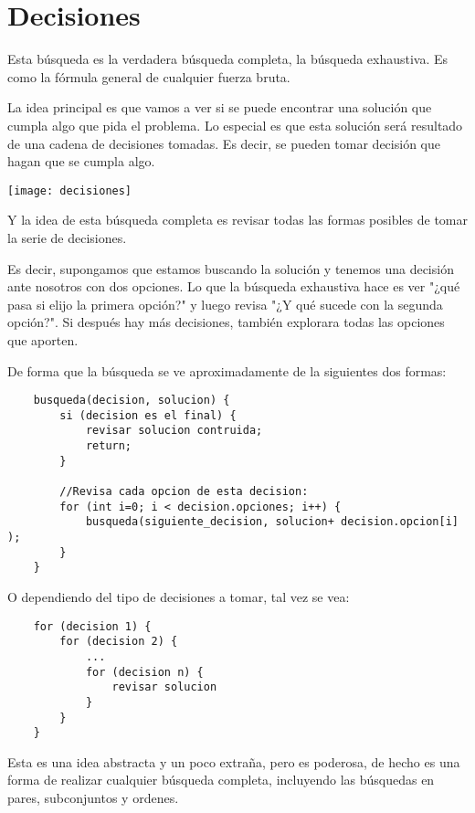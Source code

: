 \chapter*{Decisiones}

Esta búsqueda es la verdadera búsqueda completa, la búsqueda exhaustiva. Es como la fórmula general de cualquier fuerza bruta.

La idea principal es que vamos a ver si se puede encontrar una solución que cumpla algo que pida el problema. Lo especial es que esta solución será resultado de una cadena de decisiones tomadas. Es decir, se pueden tomar decisión que hagan que se cumpla algo. 


\begin{center}
	\texttt{[image: decisiones]}
\end{center}

Y la idea de esta búsqueda completa es revisar todas las formas posibles de tomar la serie de decisiones. 

Es decir, supongamos que estamos buscando la solución y tenemos una decisión ante nosotros con dos opciones. Lo que la búsqueda exhaustiva hace es ver "¿qué pasa si elijo la primera opción?" y luego revisa "¿Y qué sucede con la segunda opción?". Si después hay más decisiones, también explorara todas las opciones que aporten.

De forma que la búsqueda se ve aproximadamente de la siguientes dos formas:
\begin{lstlisting}
	busqueda(decision, solucion) {
		si (decision es el final) {
			revisar solucion contruida;
			return;
		}
	
		//Revisa cada opcion de esta decision:
		for (int i=0; i < decision.opciones; i++) {
			busqueda(siguiente_decision, solucion+ decision.opcion[i] );
		}
	}
\end{lstlisting}

O dependiendo del tipo de decisiones a tomar, tal vez se vea:

\begin{lstlisting}
	for (decision 1) {
		for (decision 2) {
			...
			for (decision n) {
				revisar solucion
			}
		}
	}
\end{lstlisting}

Esta es una idea abstracta y un poco extraña, pero es poderosa, de hecho es una forma de realizar cualquier búsqueda completa, incluyendo las búsquedas en pares, subconjuntos y ordenes.


